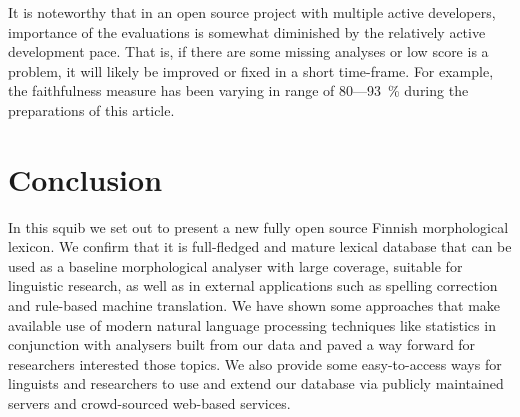 \documentclass[a4paper,12pt]{article}
\newif\iffinal
\begin{document}
It is noteworthy that in an open source project with multiple active
developers, importance of the evaluations is somewhat diminished by the
relatively active development pace. That is, if there are some missing analyses
or low score is a problem, it will likely be improved or fixed in a short
time-frame. For example, the faithfulness measure has been varying in range of
80---93~\% during the preparations of this article.


\section{Conclusion}
\label{sec:conclusion}

In this squib we set out to present a new fully open source Finnish
morphological lexicon. We confirm that it is full-fledged and mature lexical
database that can be used as a baseline morphological analyser with large
coverage, suitable for linguistic research, as well as in external applications
such as spelling correction and rule-based machine translation. We have shown
some approaches that make available use of modern natural language processing
techniques like statistics in conjunction with analysers built from our data
and paved a way forward for researchers interested those topics. We also
provide some easy-to-access ways for linguists and researchers to use and
extend our database via publicly maintained servers and crowd-sourced web-based
services.



\iffinal
\newpage
\begin{small}
    \noindent Contact Information:\\
\\
    Tommi A Pirinen\\
    Ollscoil Chathair Bhaile Átha Cliath\\
    Baile Átha Cliath 9\\
    Éire\\
    e-mail: \url{Tommi.Pirinen@computing.dcu.ie}\\
\end{small}
\fi
\end{document}
